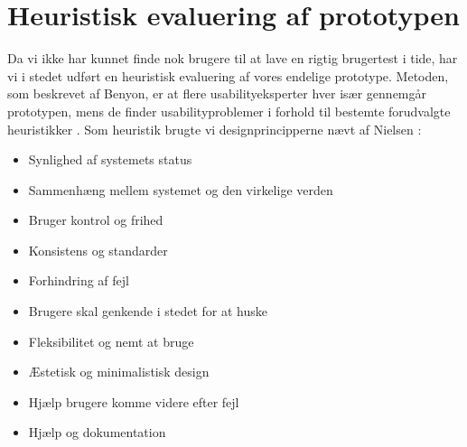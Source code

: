 \section{Heuristisk evaluering af prototypen}
Da vi ikke har kunnet finde nok brugere til at lave en rigtig brugertest i tide, har vi i stedet udført en
heuristisk evaluering af vores endelige prototype. Metoden, som beskrevet af Benyon, er at flere usabilityeksperter
hver især gennemgår prototypen, mens de finder usabilityproblemer i forhold til bestemte forudvalgte heuristikker
\cite[s. 228]{Benyon2010}. Som heuristik brugte vi designprincipperne nævt af Nielsen \cite[tabel 2.2]{nielsen}:

\begin{itemize}
\item Synlighed af systemets status
\item Sammenhæng mellem systemet og den virkelige verden
\item Bruger kontrol og frihed
\item Konsistens og standarder
\item Forhindring af fejl
\item Brugere skal genkende i stedet for at huske
\item Fleksibilitet og nemt at bruge
\item Æstetisk og minimalistisk design
\item Hjælp brugere komme videre efter fejl
\item Hjælp og dokumentation
\end{itemize}





